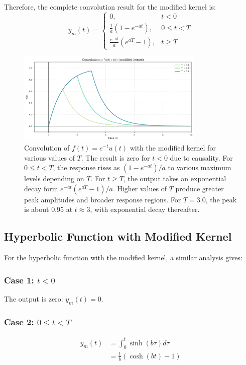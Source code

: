 \documentclass{article}
\begin{document}
	Therefore, the complete convolution result for the modified kernel is:
	\begin{equation}
		y_m(t) = 
		\begin{cases} 
			0, & t < 0 \\
			\frac{1}{a}(1 - e^{-at}), & 0 \leq t < T \\
			\frac{e^{-at}}{a}(e^{aT} - 1), & t \geq T
		\end{cases}
	\end{equation}
	
	\begin{figure}[htbp]
		\centering
		\includegraphics[width=0.8\textwidth]{figs/exp_modified_convolution.png}
		\caption{Convolution of $f(t) = e^{-t}u(t)$ with the modified kernel for various values of $T$. The result is zero for $t < 0$ due to causality. For $0 \leq t < T$, the response rises as $(1 - e^{-at})/a$ to various maximum levels depending on $T$. For $t \geq T$, the output takes an exponential decay form $e^{-at}(e^{aT} - 1)/a$. Higher values of $T$ produce greater peak amplitudes and broader response regions. For $T = 3.0$, the peak is about 0.95 at $t \approx 3$, with exponential decay thereafter.}
		\label{fig:exp_modified_convolution}
	\end{figure}
	
	\subsection{Hyperbolic Function with Modified Kernel}
	For the hyperbolic function with the modified kernel, a similar analysis gives:
	
	\subsubsection{Case 1: $t < 0$}
	The output is zero: $y_m(t) = 0$.
	
	\subsubsection{Case 2: $0 \leq t < T$}
	\begin{align}
		y_m(t) &= \int_{0}^{t} \sinh(b\tau) d\tau \\
		&= \frac{1}{b}(\cosh(bt) - 1)
	\end{align}
	
\end{document}
